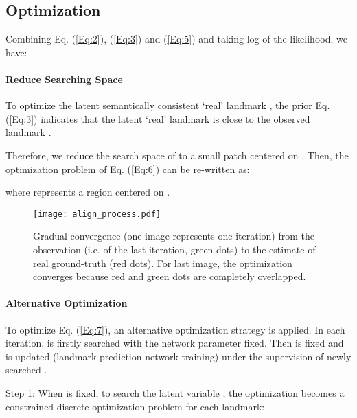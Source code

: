 \documentclass[10pt,twocolumn,letterpaper]{article}
\begin{document}
{	
	
	
	
	
	
\subsection{Optimization}
	Combining Eq. (\ref{Eq:2}), (\ref{Eq:3}) and (\ref{Eq:5}) and taking  log of the likelihood,
we have:
	
	\begin{small}
		
	\end{small}
	{\paragraph{Reduce Searching Space} To optimize the latent {semantically} consistent `real' landmark ,  the prior Eq. (\ref{Eq:3}) indicates that  the latent `real' landmark is close to the observed landmark . }
Therefore, we {reduce}
the search space {of } to a small patch centered on . Then, the optimization problem of Eq. (\ref{Eq:6}) can be re-written as:


	
	where  represents a region centered on . 


	\begin{figure*}
		\begin{center}
\texttt{[image: align\_process.pdf]}
		\end{center}
\caption{Gradual convergence (one image represents one iteration) from the observation  (i.e. 
			of the last iteration, green dots) to the estimate of real ground-truth  (red dots). 
For last image, the optimization converges because red and green dots are completely overlapped.}
		\label{fig:align}
	\end{figure*}
	
	
	
	\paragraph{Alternative Optimization}
	To optimize Eq. (\ref{Eq:7}), an alternative optimization strategy is applied. In each iteration,  is 
	firstly searched with the network parameter   fixed. Then  is fixed and  is 
	updated (landmark prediction network training) under the supervision of newly searched . 
	
	
	
	
	Step 1: When  is fixed, {to search the latent variable }, the optimization becomes a constrained discrete optimization problem {for each landmark}:
	
}
\end{document}
